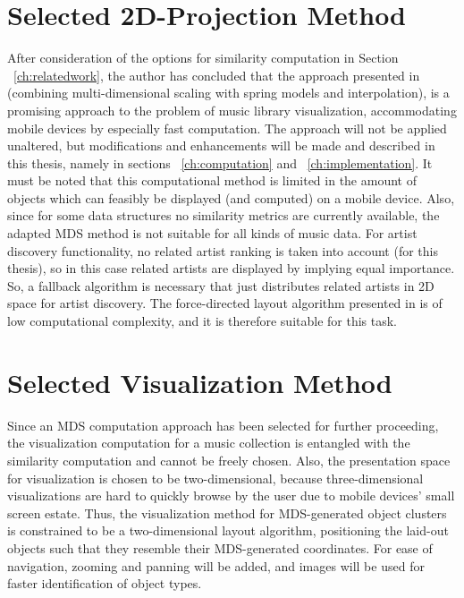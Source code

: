 \section{Selected 2D-Projection Method}

After consideration of the options for similarity computation in Section ~\ref{ch:relatedwork}, the author has concluded that the approach presented in \cite{Morrison:2003:FMS} (combining multi-dimensional scaling with spring models and interpolation), is a promising approach to the problem of music library visualization, accommodating mobile devices by especially fast computation. The approach will not be applied unaltered, but modifications and enhancements will be made and described in this thesis, namely in sections ~\ref{ch:computation} and ~\ref{ch:implementation}.
It must be noted that this computational method is limited in the amount of objects which can feasibly be displayed (and computed) on a mobile device. Also, since for some data structures no similarity metrics are currently available, the adapted MDS method is not suitable for all kinds of music data. For artist discovery functionality, no related artist ranking is taken into account (for this thesis), so in this case related artists are displayed by implying equal importance. So, a fallback algorithm is necessary that just distributes related artists in 2D space for artist discovery. The force-directed layout algorithm presented in \cite{Kobourov04} is of low computational complexity, and it is therefore suitable for this task.

\section{Selected Visualization Method}

Since an MDS computation approach has been selected for further proceeding, the visualization computation for a music collection is entangled with the similarity computation and cannot be freely chosen. Also, the presentation space for visualization is chosen to be two-dimensional, because three-dimensional visualizations are hard to quickly browse by the user due to mobile devices' small screen estate. Thus, the visualization method for MDS-generated object clusters is constrained to be a two-dimensional layout algorithm, positioning the laid-out objects such that they resemble their MDS-generated coordinates. For ease of navigation, zooming and panning will be added, and images will be used for faster identification of object types.

